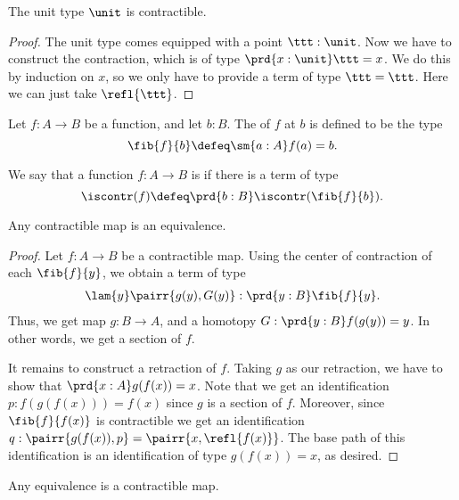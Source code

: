 \begin{thm}
The unit type $\unit$ is contractible.
\end{thm}

\begin{proof}
The unit type comes equipped with a point $\ttt:\unit$. Now we have to construct the contraction, which is of type $\prd{x:\unit}\ttt=x$. We do this by induction on $x$, so we only have to provide a term of type $\ttt=\ttt$. Here we can just take $\refl{\ttt}$. 
\end{proof}

\begin{defn}
Let $f:A\to B$ be a function, and let $b:B$. The  of $f$ at $b$ is defined to be the type
\begin{equation*}
\fib{f}{b}\defeq\sm{a:A}f(a)=b.
\end{equation*}
\end{defn}

\begin{defn}
We say that a function $f:A\to B$ is  if there is a term of type
\begin{equation*}
\iscontr(f)\defeq\prd{b:B}\iscontr(\fib{f}{b}).
\end{equation*}
\end{defn}

\begin{thm}\label{thm:equiv_contr}
Any contractible map is an equivalence.
\end{thm}

\begin{proof}
Let $f:A\to B$ be a contractible map. Using the center of contraction of each $\fib{f}{y}$, we obtain a term of type
\begin{align*}
\lam{y}\pairr{g(y),G(y)}:\prd{y:B}\fib{f}{y}.
\end{align*}
Thus, we get map $g:B\to A$, and a homotopy $G:\prd{y:B} f(g(y))=y$. In other words, we get a section of $f$.

It remains to construct a retraction of $f$. Taking $g$ as our retraction, we have to show that $\prd{x:A} g(f(x))=x$. Note that we get an identification $p:f(g(f(x)))=f(x)$ since $g$ is a section of $f$. Moreover, since $\fib{f}{f(x)}$ is contractible we get an identification $q:\pairr{g(f(x)),p}=\pairr{x,\refl{f(x)}}$. The base path of this identification is an identification of type $g(f(x))=x$, as desired.
\end{proof}

\begin{thm}\label{thm:contr_equiv}
Any equivalence is a contractible map.
\end{thm}

